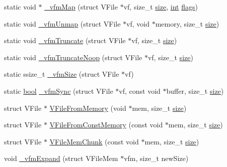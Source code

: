 \begin{DoxyCompactItemize}
\item 
static void $\ast$ \mbox{\hyperlink{vfs-mem_8c_a0e3ab05b9cdddc0a3e3881c2e5fd8ebd}{\+\_\+vfm\+Map}} (struct V\+File $\ast$vf, size\+\_\+t \mbox{\hyperlink{ioapi_8h_a014d89bd76f74ef3a29c8f04b473eb76}{size}}, \mbox{\hyperlink{ioapi_8h_a787fa3cf048117ba7123753c1e74fcd6}{int}} \mbox{\hyperlink{lr35902_2decoder_8c_a11f29eea941556f0630cfd3285f565c0}{flags}})
\item 
static void \mbox{\hyperlink{vfs-mem_8c_adb2814f95df17c75543e3b5d5bb75c68}{\+\_\+vfm\+Unmap}} (struct V\+File $\ast$vf, void $\ast$memory, size\+\_\+t \mbox{\hyperlink{ioapi_8h_a014d89bd76f74ef3a29c8f04b473eb76}{size}})
\item 
static void \mbox{\hyperlink{vfs-mem_8c_ab011a37762636847c8dcdecd850069a4}{\+\_\+vfm\+Truncate}} (struct V\+File $\ast$vf, size\+\_\+t \mbox{\hyperlink{ioapi_8h_a014d89bd76f74ef3a29c8f04b473eb76}{size}})
\item 
static void \mbox{\hyperlink{vfs-mem_8c_a0fabe82c72e3197f1683775c0962f663}{\+\_\+vfm\+Truncate\+Noop}} (struct V\+File $\ast$vf, size\+\_\+t \mbox{\hyperlink{ioapi_8h_a014d89bd76f74ef3a29c8f04b473eb76}{size}})
\item 
static ssize\+\_\+t \mbox{\hyperlink{vfs-mem_8c_acf696d7e820407942040897ac462989b}{\+\_\+vfm\+Size}} (struct V\+File $\ast$vf)
\item 
static \mbox{\hyperlink{libretro_8h_a4a26dcae73fb7e1528214a068aca317e}{bool}} \mbox{\hyperlink{vfs-mem_8c_a6d41b490b4553a84cae05c6fcc9cade3}{\+\_\+vfm\+Sync}} (struct V\+File $\ast$vf, const void $\ast$buffer, size\+\_\+t \mbox{\hyperlink{ioapi_8h_a014d89bd76f74ef3a29c8f04b473eb76}{size}})
\item 
struct V\+File $\ast$ \mbox{\hyperlink{vfs-mem_8c_abb2d34da3df9c1711f0d6c04adc7c084}{V\+File\+From\+Memory}} (void $\ast$mem, size\+\_\+t \mbox{\hyperlink{ioapi_8h_a014d89bd76f74ef3a29c8f04b473eb76}{size}})
\item 
struct V\+File $\ast$ \mbox{\hyperlink{vfs-mem_8c_a45c0959a6de2f83dc17c5b00b93352f3}{V\+File\+From\+Const\+Memory}} (const void $\ast$mem, size\+\_\+t \mbox{\hyperlink{ioapi_8h_a014d89bd76f74ef3a29c8f04b473eb76}{size}})
\item 
struct V\+File $\ast$ \mbox{\hyperlink{vfs-mem_8c_a986543bf6b5fd33614d77d3127cefa2a}{V\+File\+Mem\+Chunk}} (const void $\ast$mem, size\+\_\+t \mbox{\hyperlink{ioapi_8h_a014d89bd76f74ef3a29c8f04b473eb76}{size}})
\item 
void \mbox{\hyperlink{vfs-mem_8c_afb9f6199d8108a580de61d7ddc4a1b9b}{\+\_\+vfm\+Expand}} (struct V\+File\+Mem $\ast$vfm, size\+\_\+t new\+Size)
\end{DoxyCompactItemize}


